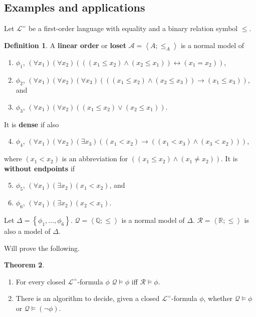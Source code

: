 \documentclass{article}
\newcommand{\Q}{\mathbb{Q}}
\newcommand{\R}{\mathbb{R}}
\newcommand{\A}{\mathcal{A}}
\renewcommand{\L}{\mathcal{L}}
\newcommand{\rb}[1]{\left( #1 \right)}
\newcommand{\cb}[1]{\left\{ #1 \right\}}
\newcommand{\ab}[1]{\left\langle #1 \right\rangle}
\newcommand{\notb}[1]{\rb{\neg #1}}
\newcommand{\orb}[2]{\rb{#1 \lor #2}}
\newcommand{\andb}[2]{\rb{#1 \land #2}}
\newcommand{\impb}[2]{\rb{#1 \rightarrow #2}}
\newcommand{\iffb}[2]{\rb{#1 \leftrightarrow #2}}
\newcommand{\fab}[1]{\rb{\forall #1}}
\newcommand{\teb}[1]{\rb{\exists #1}}
\newcommand{\eqb}[2]{\rb{#1 = #2}}
\theoremstyle{definition}\newtheorem{definition}{Definition}[subsection]
\theoremstyle{definition}\newtheorem{remark}[definition]{Remark}
\theoremstyle{definition}\newtheorem*{example}{Example}
\theoremstyle{definition}\newtheorem*{note}{Note}
\newtheorem{theorem}[definition]{Theorem}
\begin{document}
\subsection{Examples and applications}

Let $ \L^= $ be a first-order language with equality and a binary relation symbol $ \le $.

\begin{definition}
A \textbf{linear order} or \textbf{loset} $ \A = \ab{A; \le_A} $ is a normal model of
\begin{enumerate}
\item $ \phi_1 $, $ \fab{x_1}\fab{x_2}\iffb{\andb{\rb{x_1 \le x_2}}{\rb{x_2 \le x_1}}}{\eqb{x_1}{x_2}} $,
\item $ \phi_2 $, $ \fab{x_1}\fab{x_2}\fab{x_3}\impb{\andb{\rb{x_1 \le x_2}}{\rb{x_2 \le x_3}}}{\rb{x_1 \le x_3}} $, and
\item $ \phi_3 $, $ \fab{x_1}\fab{x_2}\orb{\rb{x_1 \le x_2}}{\rb{x_2 \le x_1}} $.
\end{enumerate}
It is \textbf{dense} if also
\begin{enumerate}
\setcounter{enumi}{3}
\item $ \phi_4 $, $ \fab{x_1}\fab{x_2}\teb{x_3}\impb{\rb{x_1 < x_2}}{\andb{\rb{x_1 < x_3}}{\rb{x_3 < x_2}}} $,
\end{enumerate}
where $ \rb{x_1 < x_2} $ is an abbreviation for $ \andb{\rb{x_1 \le x_2}}{\rb{x_1 \ne x_2}} $. It is \textbf{without endpoints} if
\begin{enumerate}
\setcounter{enumi}{4}
\item $ \phi_5 $, $ \fab{x_1}\teb{x_2}\rb{x_1 < x_2} $, and
\item $ \phi_6 $, $ \fab{x_1}\teb{x_2}\rb{x_2 < x_1} $.
\end{enumerate}
Let $ \Delta = \cb{\phi_1, \dots, \phi_6} $. $ \mathcal{Q} = \ab{\Q; \le} $ is a normal model of $ \Delta $. $ \mathcal{R} = \ab{\R; \le} $ is also a model of $ \Delta $.
\end{definition}

Will prove the following.

\begin{theorem}
\label{thm:2.7.2}
\hfill
\begin{enumerate}
\item For every closed $ \L^= $-formula $ \phi $ $ \mathcal{Q} \vDash \phi $ iff $ \mathcal{R} \vDash \phi $.
\item There is an algorithm to decide, given a closed $ \L^= $-formula $ \phi $, whether $ \mathcal{Q} \vDash \phi $ or $ \mathcal{Q} \vDash \notb{\phi} $.
\end{enumerate}
\end{theorem}
\end{document}
